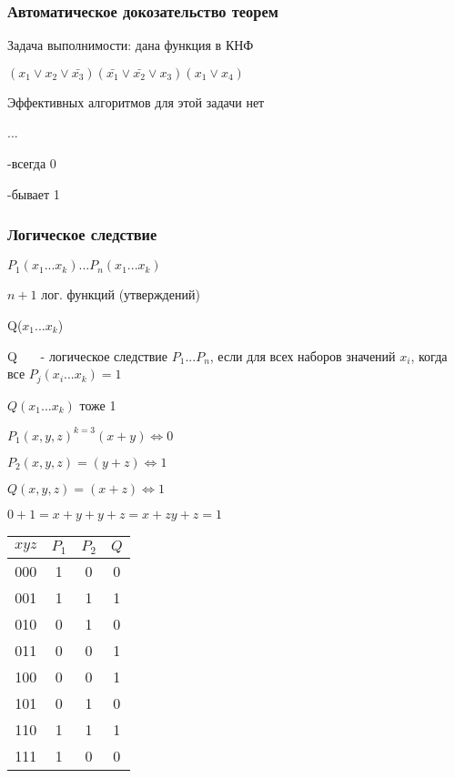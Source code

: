 \documentclass[russian]{lecture-notes}
\begin{document}
	\subsubsection{Автоматическое докозательство теорем}

	Задача выполнимости: дана функция в КНФ

	$(x_{1} \lor x_{2} \lor \bar{x_{3}})(\bar{x_{1}} \lor \bar{x_{2}} \lor x_{3})(x_{1} \lor x_{4})$

	Эффективных алгоритмов для этой задачи нет

	...

	-всегда 0

	-бывает 1

	\subsubsection{Логическое следствие}

	\begin{definition}
		$P_{1}(x_{1}...x_{k})...P_{n}(x_{1}...x_{k})$

		$n+1$ лог. функций (утверждений)

		Q($x_{1} ... x_{k}$)

		Q ~~~- логическое следствие $P_{1} ... P_{n}$, если для всех наборов значений $x_{i}$, когда все $P_{j}(x_{i}...x_{k}) = 1$

		$Q(x_{1}...x_{k})$ тоже 1

		\end{definition}


	\begin{example}
		$P_{1}(x,y,z)^{k=3} (x+y)\Leftrightarrow 0 $

		$P_{2}(x,y,z) = (y+z) \Leftrightarrow 1$

		$Q(x,y,z) = (x+z) \Leftrightarrow 1 $

		$0+1 = x+y+y+z=x+zy+z=1$


		\end{example}

	\begin{table}[h!]
	\begin{tabular}{|c|c|c|c|}
		\hline
		$xyz$ & $P_{1}$ & $P_{2}$ & $Q$\\ \hline
		000 & 1 & 0 & 0\\ \hline
		001 & 1 & 1 & 1\\ \hline
		010 & 0 & 1 & 0\\ \hline
		011 & 0 & 0 & 1 \\ \hline
		100 & 0 & 0 & 1 \\ \hline
		101 & 0 & 1 & 0 \\ \hline
		110 & 1 & 1 & 1 \\ \hline
		111 & 1 & 0 & 0 \\ \hline
\end{tabular}
\end{table}
\end{document}
